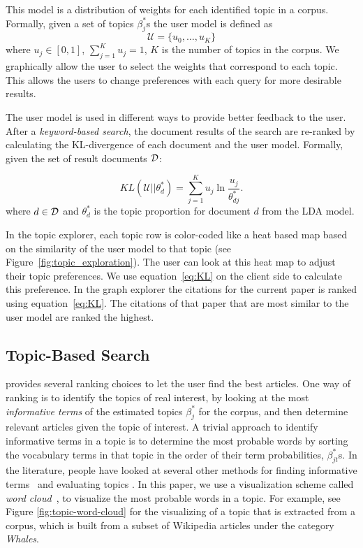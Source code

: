 This model is a distribution of weights for each identified topic in 
a corpus. Formally, given a set of topics $\beta_j^{*}$s the user 
model is defined as
$$
\mathcal{U} = \{u_0, \ldots, u_{K}\}
$$
where $u_j \in [0,1]$, $\sum_{j = 1}^K u_j = 1$, $K$ is the number 
of topics in the corpus.
We graphically allow the user to select the weights that correspond to
each topic. This allows the users to change preferences with each query
for more desirable results.

The user model is used in different ways to provide better feedback to
the user. After a \textsl{keyword-based search}, the document results of the search 
are re-ranked by calculating the KL-divergence of each document and the
user model. Formally, given the set of result documents $\cal D$:

\begin{equation} \label{eq:KL}
KL(\mathcal{U}||\theta^*_{d}) = \sum_{j = 1}^K u_j \ln \frac{u_j}{\theta^*_{dj}}.
\end{equation}
where $d \in {\cal D}$ and $\theta^*_{d}$ is the topic proportion 
for document $d$ from the LDA model. 

In the topic explorer, each topic row is color-coded like a heat 
based map based on the similarity of the user model to that topic (see Figure~\ref{fig:topic_exploration}).
The user can look at this heat map to adjust their topic preferences.
We use equation~\ref{eq:KL} on the client side to calculate this preference. 
In the graph explorer the citations for the current paper is ranked
using equation~\ref{eq:KL}. The citations of that paper that are most
similar to the user model are ranked the highest.


\subsection{Topic-Based Search}

\system provides several ranking choices to let the user find  
the best articles. One way of ranking is to identify the topics of 
real interest, by looking at the most \textsl{informative terms} of 
the estimated topics $\beta_j^{*}$ for the corpus, and then 
determine relevant articles given the topic of interest. A trivial 
approach to identify informative terms in a topic is to determine 
the most probable words by sorting the vocabulary terms in that 
topic in the order of their term probabilities, $\beta_{jt}^{*}$s. 
In the literature, people have looked at several other methods for 
finding informative terms~\cite{2012-termite} and evaluating topics 
\cite{mimno2011optimizing}. In this paper, we use a visualization 
scheme called \textsl{word cloud}~\cite{Davis2013}, to visualize the 
most probable words in a topic. For example, see Figure 
\ref{fig:topic-word-cloud} for the visualizing of a topic that is 
extracted from a corpus, which is built from a subset of Wikipedia 
articles under the category \textsl{Whales}. 
       
